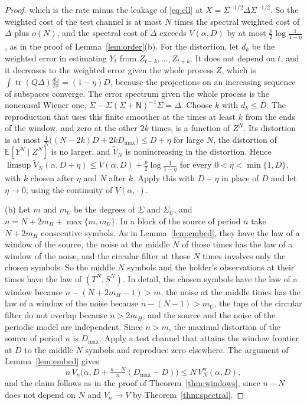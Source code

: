 \documentclass[11pt,onecolumn]{IEEEtran}
\newcommand{\E}{\mathbb{E}}
\newcommand{\tr}{\operatorname{tr}}
\newcommand{\dw}{\tfrac{d\omega}{2\pi}}
\begin{document}
\begin{proof}
which is the rate minus the leakage of
\eqref{eq:ell} at $X=\Sigma^{-1/2}\Delta\Sigma^{-1/2}$. So the weighted cost of the test channel is at most
$N$ times the spectral weighted cost of $\Delta$ plus $o(N)$, and the
spectral cost of $\Delta$ exceeds $V(\alpha,D)$ by at most
$\tfrac p2\log\tfrac1{1-\eta}$, as in the proof of
Lemma~\ref{lem:order}(b). For the distortion, let $d_k$ be the weighted
error in estimating $Y_t$ from $Z_{t-k},\dots,Z_{t+k}$. It does not
depend on $t$, and it decreases to the weighted error given the whole
process $Z$, which is $\int\tr(Q\Delta)\dw=(1-\eta)D$, because the
projections on an increasing sequence of subspaces converge. The error spectrum given the whole process is the noncausal Wiener
one, $\Sigma-\Sigma(\Sigma+\mathsf N)^{-1}\Sigma=\Delta$. Choose $k$
with $d_k\le D$. The reproduction that uses this finite smoother at the
times at least $k$ from the ends of the window, and zero at the other
$2k$ times, is a function of $Z^N$. Its distortion is at most
$\tfrac1N\bigl((N-2k)D+2kD_{\max}\bigr)\le D+\eta$ for large $N$, the
distortion of $\E[Y^N\mid Z^N]$ is no larger, and $\tilde V_N$ is
nonincreasing in the distortion. Hence
$\limsup\tilde V_N(\alpha,D+\eta)\le V(\alpha,D)+\tfrac p2\log\tfrac1{1-\eta}$
for every $0<\eta<\min\{1,D\}$, with $k$ chosen after $\eta$ and $N$ after
$k$. Apply this with $D-\eta$ in place of $D$ and let
$\eta\to0$, using the continuity of $V(\alpha,\cdot)$.

(b) Let $m$ and $m_U$ be the degrees of $\Sigma$ and $\Sigma_U$, and
$n=N+2m_H+\max\{m,m_U\}$. In a block of the source of period $n$ take
$N+2m_H$ consecutive symbols. As in Lemma~\ref{lem:embed}, they have the
law of a window of the source, the noise at the middle $N$ of those
times has the law of a window of the noise, and the circular filter at
those $N$ times involves only the chosen symbols. So the middle $N$
symbols and the holder's observations at their times have the law of
$(T^N,S^N)$. In detail, the chosen symbols have the law of a window
because $n-(N+2m_H-1)>m$, the noise at the middle times has the law of
a window of the noise because $n-(N-1)>m_U$, the taps of the circular
filter do not overlap because $n>2m_H$, and the source and the noise
of the periodic model are independent. Since $n>m$, the maximal
distortion of the source of period $n$ is $D_{\max}$. Apply a test channel that attains the window frontier at
$D$ to the middle $N$ symbols and reproduce zero elsewhere. The
argument of Lemma~\ref{lem:embed} gives
\[
n\,V_n\bigl(\alpha,D+\tfrac{n-N}n(D_{\max}-D)\bigr)\le N\,V^{\mathrm w}_N(\alpha,D),
\]
and the claim follows as in the proof of Theorem~\ref{thm:windows},
since $n-N$ does not depend on $N$ and $V_n\to V$ by
Theorem~\ref{thm:spectral}.
\end{proof}
\end{document}
